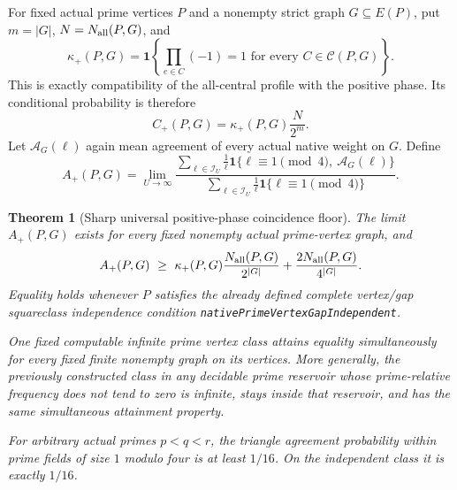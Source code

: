 \documentclass[11pt]{article}
\newtheorem{theorem}{Theorem}[section]
\begin{document}
For fixed actual prime vertices \(P\) and a nonempty strict graph
\(G\subseteq E(P)\), put \(m=|G|\), \(N=N_{\rm all}(P,G)\), and
\[
 \kappa_+(P,G)=
 \mathbf1\left\{\prod_{e\in C}(-1)=1
                        \text{ for every }C\in\mathcal C(P,G)\right\}.
\]
This is exactly compatibility of the all-central profile with the
positive phase. Its conditional probability is therefore
\[
                         C_+(P,G)=\kappa_+(P,G)\frac{N}{2^m}.
\]
Let \(\mathcal A_G(\ell)\) again mean agreement of every actual native
weight on \(G\). Define
\[
 A_+(P,G)=\lim_{U\to\infty}
 \frac{\displaystyle\sum_{\ell\in\mathcal I_U}\frac1\ell
       \mathbf1\{\ell\equiv1\pmod4,\ \mathcal A_G(\ell)\}}
      {\displaystyle\sum_{\ell\in\mathcal I_U}\frac1\ell
       \mathbf1\{\ell\equiv1\pmod4\}}.
\]

\begin{theorem}[Sharp universal positive-phase coincidence floor]
\label{thm:native-positive-phase-coincidence}
The limit \(A_+(P,G)\) exists for every fixed nonempty actual
prime-vertex graph, and
\begin{equation}\label{eq:native-positive-phase-floor}
 A_+(P,G)\ \geq\
       \kappa_+(P,G)\frac{N_{\rm all}(P,G)}{2^{|G|}}
          +\frac{2N_{\rm all}(P,G)}{4^{|G|}}.
\end{equation}
Equality holds whenever \(P\) satisfies the already defined complete
vertex/gap squareclass independence condition
\textnormal{\texttt{nativePrimeVertexGapIndependent}}.

One fixed computable infinite prime vertex class attains equality
simultaneously for every fixed finite nonempty graph on its vertices.
More generally, the previously constructed class in any decidable
prime reservoir whose prime-relative frequency does not tend to zero
is infinite, stays inside that reservoir, and has the same simultaneous
attainment property.

For arbitrary actual primes \(p<q<r\), the triangle agreement
probability within prime fields of size \(1\) modulo four is at least
\(1/16\). On the independent class it is exactly \(1/16\).
\end{theorem}
\end{document}
